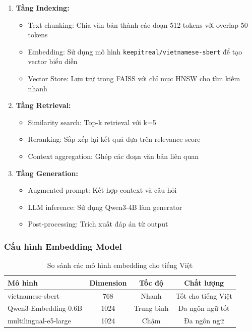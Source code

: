\begin{enumerate}
    \item \textbf{Tầng Indexing:}
    \begin{itemize}
        \item Text chunking: Chia văn bản thành các đoạn 512 tokens với overlap 50 tokens
        \item Embedding: Sử dụng mô hình \texttt{keepitreal/vietnamese-sbert} để tạo vector biểu diễn
        \item Vector Store: Lưu trữ trong FAISS với chỉ mục HNSW cho tìm kiếm nhanh
    \end{itemize}
    
    \item \textbf{Tầng Retrieval:}
    \begin{itemize}
        \item Similarity search: Top-k retrieval với k=5
        \item Reranking: Sắp xếp lại kết quả dựa trên relevance score
        \item Context aggregation: Ghép các đoạn văn bản liên quan
    \end{itemize}
    
    \item \textbf{Tầng Generation:}
    \begin{itemize}
        \item Augmented prompt: Kết hợp context và câu hỏi
        \item LLM inference: Sử dụng Qwen3-4B làm generator
        \item Post-processing: Trích xuất đáp án từ output
    \end{itemize}
\end{enumerate}

\subsubsection{Cấu hình Embedding Model}

\begin{table}[H]
\centering
\caption{So sánh các mô hình embedding cho tiếng Việt}
\label{tab:embedding-models}
\begin{tabular}{|l|c|c|c|}
\hline
\textbf{Mô hình} & \textbf{Dimension} & \textbf{Tốc độ} & \textbf{Chất lượng} \\
\hline
vietnamese-sbert & 768 & Nhanh & Tốt cho tiếng Việt \\
Qwen3-Embedding-0.6B & 1024 & Trung bình & Đa ngôn ngữ tốt \\
multilingual-e5-large & 1024 & Chậm & Đa ngôn ngữ \\
\hline
\end{tabular}
\end{table}

